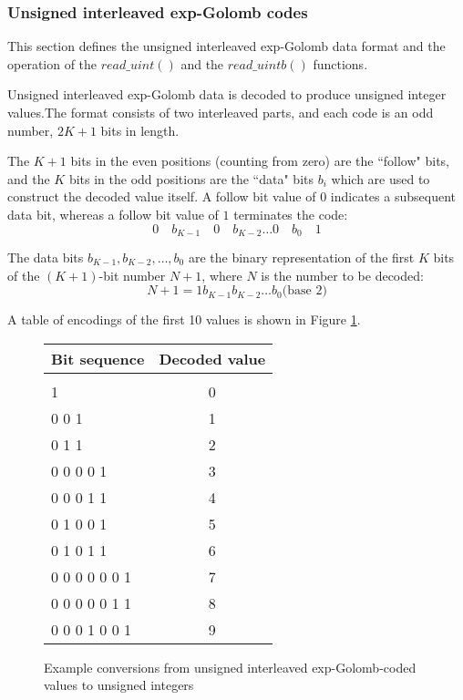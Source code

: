 \subsubsection{Unsigned interleaved exp-Golomb codes}
This section defines the unsigned interleaved exp-Golomb data format and the operation
of the $read\_uint()$ and the $read\_uintb()$ functions. 

Unsigned interleaved exp-Golomb data is decoded to produce unsigned
 integer values.The format consists of two interleaved parts, 
and each code is an odd number, $2K+1$ bits in length.

The $K+1$ bits in the even positions (counting from zero) are the ``follow" bits, and 
the $K$ bits in the odd positions are the ``data" bits $b_i$ which are used to construct
the decoded value itself. A follow bit value of $0$ indicates a subsequent data bit,
whereas a follow bit value of $1$ terminates the code:
\begin{equation*}
0\quad b_{K-1}\quad 0\quad b_{K-2}\hdots 0\quad b_{0}\quad 1
\end{equation*}

The data bits $b_{K-1}, b_{K-2}, \hdots, b_0$ are the binary representation 
 of the first $K$ bits of the $(K+1)$-bit number 
$N+1$, where $N$ is the number to be decoded:
\begin{equation*}
N+1=1 b_{K-1} b_{K-2}\hdots b_0 \text{(base $2$)}
\end{equation*}

A table of encodings of the first 10 values is shown in Figure \ref{uegolcodings}.

\begin{figure}[h]
\centering
\begin{tabular}{l|c}
Bit sequence & Decoded value \\
\hline\\
1                 &  0\\
0 0 1             &  1\\
0 1 1             &  2\\
0 0 0 0 1         &  3\\
0 0 0 1 1         &  4\\
0 1 0 0 1         &  5\\
0 1 0 1 1         &  6\\
0 0 0 0 0 0 1     &  7\\
0 0 0 0 0 1 1     &  8\\
0 0 0 1 0 0 1     &  9\\
\end{tabular}

\caption{Example conversions from unsigned interleaved exp-Golomb-coded 
values to unsigned integers \label{uegolcodings}}
\end{figure}

